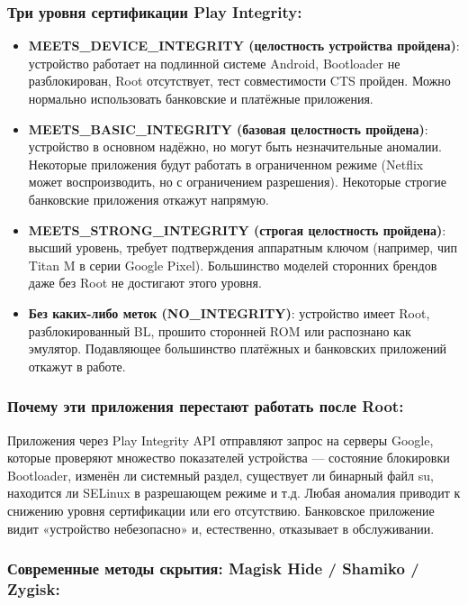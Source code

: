 \subsubsection*{Три уровня сертификации Play Integrity:}

\begin{itemize}
  \item \textbf{MEETS\_DEVICE\_INTEGRITY (целостность устройства пройдена)}: устройство работает на подлинной системе Android, Bootloader не разблокирован, Root отсутствует, тест совместимости CTS пройден. Можно нормально использовать банковские и платёжные приложения.
  \item \textbf{MEETS\_BASIC\_INTEGRITY (базовая целостность пройдена)}: устройство в основном надёжно, но могут быть незначительные аномалии. Некоторые приложения будут работать в ограниченном режиме (Netflix может воспроизводить, но с ограничением разрешения). Некоторые строгие банковские приложения откажут напрямую.
  \item \textbf{MEETS\_STRONG\_INTEGRITY (строгая целостность пройдена)}: высший уровень, требует подтверждения аппаратным ключом (например, чип Titan M в серии Google Pixel). Большинство моделей сторонних брендов даже без Root не достигают этого уровня.
  \item \textbf{Без каких-либо меток (NO\_INTEGRITY)}: устройство имеет Root, разблокированный BL, прошито сторонней ROM или распознано как эмулятор. Подавляющее большинство платёжных и банковских приложений откажут в работе.
\end{itemize}

\subsubsection*{Почему эти приложения перестают работать после Root:}

Приложения через Play Integrity API отправляют запрос на серверы Google, которые проверяют множество показателей устройства — состояние блокировки Bootloader, изменён ли системный раздел, существует ли бинарный файл su, находится ли SELinux в разрешающем режиме и т.д. Любая аномалия приводит к снижению уровня сертификации или его отсутствию. Банковское приложение видит «устройство небезопасно» и, естественно, отказывает в обслуживании.

\subsubsection*{Современные методы скрытия: Magisk Hide / Shamiko / Zygisk:}

